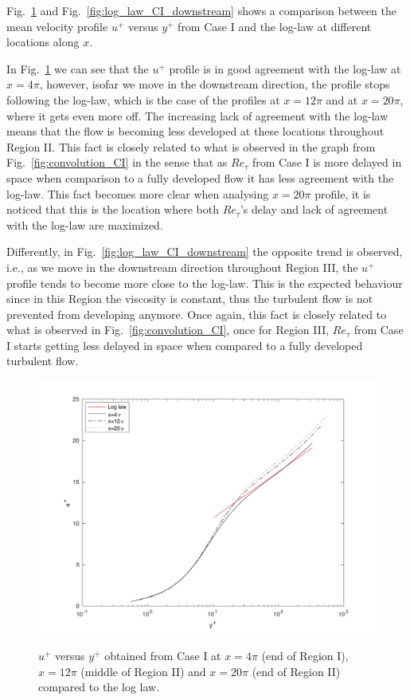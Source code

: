 \documentclass[twocolumn,10pt]{asme2e}
\begin{document}
Fig.~\ref{fig:log_law_CI_upstream} and Fig.~\ref{fig:log_law_CI_downstream} shows a comparison between the mean velocity profile \(u^+\) versus \(y^+\) from Case I and the log-law at different locations along \(x\).

In Fig.~\ref{fig:log_law_CI_upstream} we can see that the \(u^+\) profile is in good agreement with the log-law at \(x=4{\pi}\), however, isofar we move in the downstream direction, the profile stops following the log-law, which is the case of the profiles at \(x=12{\pi}\) and at \(x=20{\pi}\), where it gets even more off. The increasing lack of agreement with the log-law means that the flow is becoming less developed at these locations throughout Region II. This fact is closely related to what is observed in the graph from Fig.~\ref{fig:convolution_CI} in the sense that as \(Re_{\tau}\) from Case I is more delayed in space when comparison to a fully developed flow it has less agreement with the log-law. This fact becomes more clear when analysing \(x=20{\pi}\) profile, it is noticed that this is the location where both \(Re_{\tau}\)'s delay and lack of agreement with the log-law are maximized.

Differently, in Fig.~\ref{fig:log_law_CI_downstream} the opposite trend is observed, i.e., as we move in the downstream direction throughout Region III, the \(u^+\) profile tends to become more close to the log-law. This is the expected behaviour since in this Region the viscosity is constant, thus the turbulent flow is not prevented from developing anymore. Once again, this fact is closely related to what is observed in Fig.~\ref{fig:convolution_CI}, once for Region III, \(Re_{\tau}\) from Case I starts getting less delayed in space when compared to a fully developed turbulent flow.

\begin{figure}[t]
\centering
\scalebox{0.5}
{\includegraphics{log_law_CI_upstream.pdf}}
\caption{\(u^+\) versus \(y^+\) obtained from Case I at \(x=4{\pi}\) (end of Region I), \(x=12{\pi}\) (middle of Region II) and \(x=20{\pi}\) (end of Region II) compared to the log law.}
\label{fig:log_law_CI_upstream}
\end{figure}
\end{document}
